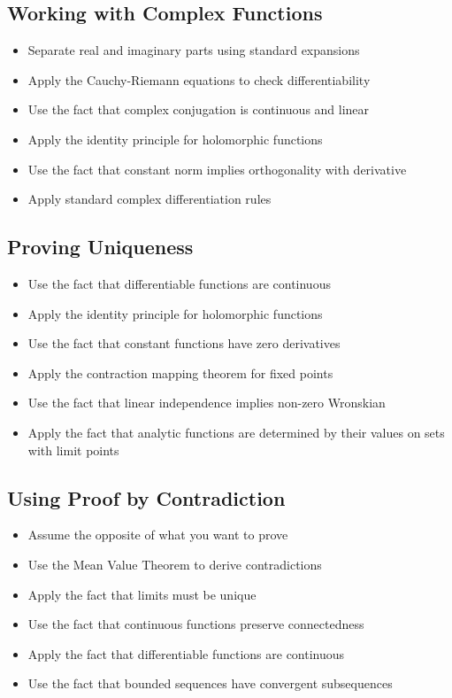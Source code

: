 \subsection*{Working with Complex Functions}
\begin{itemize}
\item Separate real and imaginary parts using standard expansions
\item Apply the Cauchy-Riemann equations to check differentiability
\item Use the fact that complex conjugation is continuous and linear
\item Apply the identity principle for holomorphic functions
\item Use the fact that constant norm implies orthogonality with derivative
\item Apply standard complex differentiation rules
\end{itemize}

\subsection*{Proving Uniqueness}
\begin{itemize}
\item Use the fact that differentiable functions are continuous
\item Apply the identity principle for holomorphic functions
\item Use the fact that constant functions have zero derivatives
\item Apply the contraction mapping theorem for fixed points
\item Use the fact that linear independence implies non-zero Wronskian
\item Apply the fact that analytic functions are determined by their values on sets with limit points
\end{itemize}

\subsection*{Using Proof by Contradiction}
\begin{itemize}
\item Assume the opposite of what you want to prove
\item Use the Mean Value Theorem to derive contradictions
\item Apply the fact that limits must be unique
\item Use the fact that continuous functions preserve connectedness
\item Apply the fact that differentiable functions are continuous
\item Use the fact that bounded sequences have convergent subsequences
\end{itemize}

